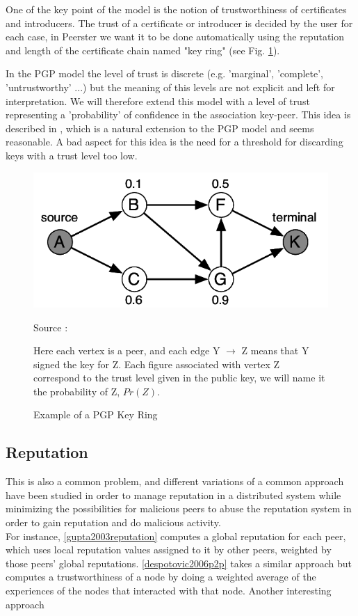 \documentclass[]{article}
\begin{document}
            One of the key point of the model is the notion of trustworthiness of certificates and introducers. The trust of a certificate or introducer is decided by the user for each case, in Peerster we want it to be done automatically using the reputation and length of the certificate chain named "key ring" (see Fig. \ref{fig:pgp-key-ring}).
            
            In the PGP model the level of trust is discrete (e.g. 'marginal', 'complete', 'untrustworthy' ...) but the meaning of this levels are not explicit and left for interpretation. We will therefore extend this model with a level of trust representing a 'probability' of confidence in the association key-peer. This idea is described in \cite{haenni2007new}, which is a natural extension to the PGP model and seems reasonable.
            A bad aspect for this idea is the need for a threshold for discarding keys with a trust level too low.
            
            \begin{figure}[h]
                \includegraphics{pgp-key-ring}
                \centering
                \caption{Example of a PGP Key Ring}
                \label{fig:pgp-key-ring}
                Source : \cite{haenni2007new}
                
                Here each vertex is a peer, and each edge Y $\rightarrow$ Z means that Y signed the key for Z.
                Each figure associated with vertex Z  correspond to the trust level given in the public key, we will name it the probability of Z, $Pr(Z)$.
            \end{figure}
            
        \subsection{Reputation}
        This is also a common problem, and different variations of a common approach have been studied in order to manage reputation in a distributed system while minimizing the possibilities for malicious peers to abuse the reputation system in order to gain reputation and do malicious activity.
        \\
        For instance, \ref{gupta2003reputation} computes a global reputation for each peer, which uses local reputation values assigned to it by other peers, weighted by those peers' global reputations.
        \ref{despotovic2006p2p} takes a similar approach but computes a trustworthiness of a node by doing a weighted average of the experiences of the nodes that interacted with that node.
        Another interesting approach
        
\end{document}
